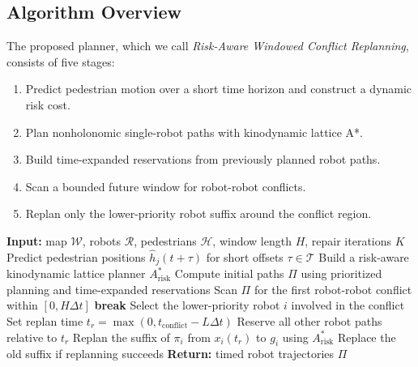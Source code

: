 \documentclass[10pt,twocolumn,letterpaper]{article}
\begin{document}
\subsection{Algorithm Overview}
The proposed planner, which we call \emph{Risk-Aware Windowed Conflict Replanning}, consists of five stages:
\begin{enumerate}
    \item Predict pedestrian motion over a short time horizon and construct a dynamic risk cost.
    \item Plan nonholonomic single-robot paths with kinodynamic lattice A*.
    \item Build time-expanded reservations from previously planned robot paths.
    \item Scan a bounded future window for robot-robot conflicts.
    \item Replan only the lower-priority robot suffix around the conflict region.
\end{enumerate}

\begin{algorithm}[t]
\caption{Risk-Aware Windowed Conflict Replanning}
\label{alg:rawcr}
\begin{algorithmic}[1]
\STATE \textbf{Input:} map $\mathcal{W}$, robots $\mathcal{R}$, pedestrians $\mathcal{H}$, window length $H$, repair iterations $K$
\STATE Predict pedestrian positions $\hat{h}_j(t+\tau)$ for short offsets $\tau \in \mathcal{T}$
\STATE Build a risk-aware kinodynamic lattice planner $A^*_{\mathrm{risk}}$
\STATE Compute initial paths $\Pi$ using prioritized planning and time-expanded reservations
    \STATE Scan $\Pi$ for the first robot-robot conflict within $[0,H\Delta t]$
        \STATE \textbf{break}
    \ENDIF
    \STATE Select the lower-priority robot $i$ involved in the conflict
    \STATE Set replan time $t_r = \max(0, t_{\mathrm{conflict}} - L\Delta t)$
    \STATE Reserve all other robot paths relative to $t_r$
    \STATE Replan the suffix of $\pi_i$ from $x_i(t_r)$ to $g_i$ using $A^*_{\mathrm{risk}}$
    \STATE Replace the old suffix if replanning succeeds
\ENDFOR
\STATE \textbf{Return:} timed robot trajectories $\Pi$
\end{algorithmic}
\end{algorithm}
\end{document}
